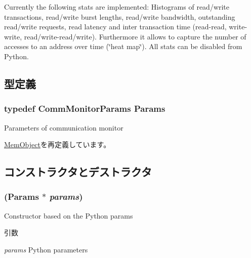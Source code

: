 Currently the following stats are implemented: Histograms of read/write transactions, read/write burst lengths, read/write bandwidth, outstanding read/write requests, read latency and inter transaction time (read-\/read, write-\/write, read/write-\/read/write). Furthermore it allows to capture the number of accesses to an address over time (\char`\"{}heat map\char`\"{}). All stats can be disabled from Python. 

\subsection{型定義}
\hypertarget{classCommMonitor_a945848d2cb95179e45fffc6a7f41da84}{
\subsubsection[{Params}]{\setlength{\rightskip}{0pt plus 5cm}typedef CommMonitorParams {\bf Params}}}
\label{classCommMonitor_a945848d2cb95179e45fffc6a7f41da84}
Parameters of communication monitor 

\hyperlink{classMemObject_a905bbc621eeec0ed08859e21c8c95412}{MemObject}を再定義しています。

\subsection{コンストラクタとデストラクタ}
\hypertarget{classCommMonitor_af8e768be1328f879d2240d44e6f430e1}{
\subsubsection[{CommMonitor}]{ ({\bf Params} $\ast$ {\em params})}}
\label{classCommMonitor_af8e768be1328f879d2240d44e6f430e1}
Constructor based on the Python params


\begin{DoxyParams}{引数}
\item[{\em params}]Python parameters \end{DoxyParams}



